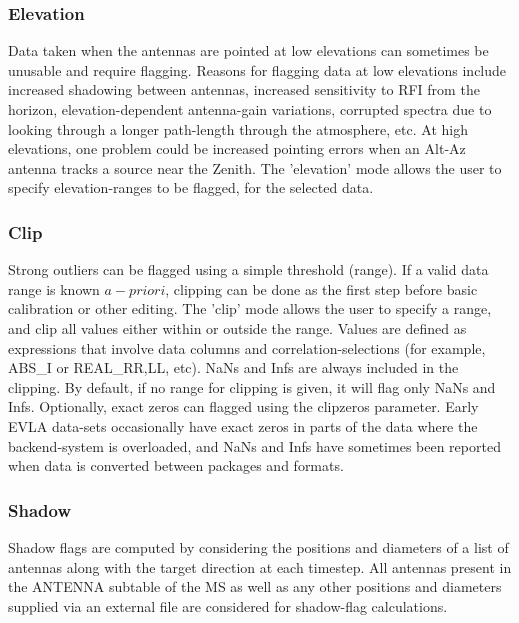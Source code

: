 \subsubsection{Elevation}

Data taken when the antennas are pointed at low elevations can sometimes be unusable and require flagging.  Reasons for 
flagging data at low elevations include increased shadowing between antennas, increased sensitivity to RFI from the horizon, 
elevation-dependent antenna-gain variations, corrupted spectra due to looking
through a longer path-length through the atmosphere, etc.  At high elevations, one problem could be increased pointing 
errors when an Alt-Az antenna tracks a source near the Zenith. The 'elevation'
mode allows the user to specify elevation-ranges to be flagged, for the selected data.

\subsubsection{Clip}

Strong outliers can be flagged using a simple threshold (range). If a valid data
range is known $a-priori$, clipping can be done as the first step before basic calibration or other editing.
The 'clip' mode allows the user to specify a range, and clip all values either within or outside the range. 
Values are defined as expressions that involve data columns and
correlation-selections (for example, ABS\_I or REAL\_RR,LL, etc).
NaNs and Infs are always included in the clipping. By default, if no range for
clipping is given, it will flag only NaNs and Infs. Optionally, exact zeros can
flagged using the clipzeros parameter. Early EVLA data-sets occasionally have
exact zeros in parts of the data where the backend-system is overloaded, and NaNs and Infs have sometimes been 
reported when data is converted between packages and formats.


\subsubsection{Shadow}

Shadow flags are computed by considering the positions and diameters of a list of antennas
along with the target direction at each timestep.  
All antennas present in the ANTENNA subtable of the MS as well as any other positions 
and diameters supplied via an external file are considered for shadow-flag calculations. 

